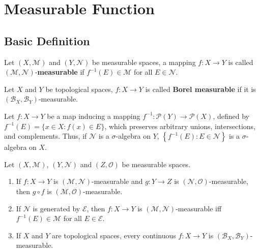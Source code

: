 \documentclass[12pt, a4paper, oneside]{book}
\begin{document}
\section{Measurable Function} %
\subsection{Basic Definition}
\begin{definition}
    Let $\left(X, \mathcal{M}\right)$ and $\left(Y, \mathcal{N}\right)$ be measurable spaces, a mapping $f: X \rightarrow Y$ is called $(\mathcal{M}, \mathcal{N})$-\textbf{measurable} if $f^{-1}(E) \in \mathcal{M}$ for all $E \in \mathcal{N}$.
\end{definition}

\begin{definition}
    Let $X$ and $Y$ be topological spaces, $f: X \rightarrow Y$ is called \textbf{Borel measurable} if it is $\left(\mathcal{B}_X, \mathcal{B}_Y\right)$-measurable.
\end{definition}

\begin{lemma}
    Let $f: X \rightarrow Y$ be a map inducing a mapping $f^{-1}: \mathcal{P}(Y) \rightarrow \mathcal{P}(X)$, defined by $f^{-1}(E)=\{x \in X: f(x) \in E\}$, which preserves arbitrary unions, intersections, and complements.
    Thus, if $\mathcal{N}$ is a $\sigma$-algebra on $Y$, $\left\{f^{-1}(E): E \in \mathcal{N}\right\}$ is a $\sigma$-algebra on $X$.
\end{lemma}

\begin{proposition}
    Let $\left(X, \mathcal{M}\right)$, $\left(Y, \mathcal{N}\right)$ and $\left(Z,\mathcal{O}\right)$ be measurable spaces.
    \begin{enumerate}
        \item
              If $f: X \rightarrow Y$ is $(\mathcal{M}, \mathcal{N})$-measurable and $g: Y \rightarrow Z$ is $(\mathcal{N}, \mathcal{O})$-measurable, then $g \circ f$ is $(\mathcal{M}, \mathcal{O})$-measurable.
        \item
              If $\mathcal{N}$ is generated by $\mathcal{E}$, then $f: X \rightarrow Y$ is $(\mathcal{M}, \mathcal{N})$-measurable iff $f^{-1}(E) \in \mathcal{M}$ for all $E \in \mathcal{E}$.
        \item
              If $X$ and $Y$ are topological spaces, every continuous $f: X \rightarrow Y$ is $\left(\mathcal{B}_X, \mathcal{B}_Y\right)$-measurable.
    \end{enumerate}
\end{proposition}
\end{document}
